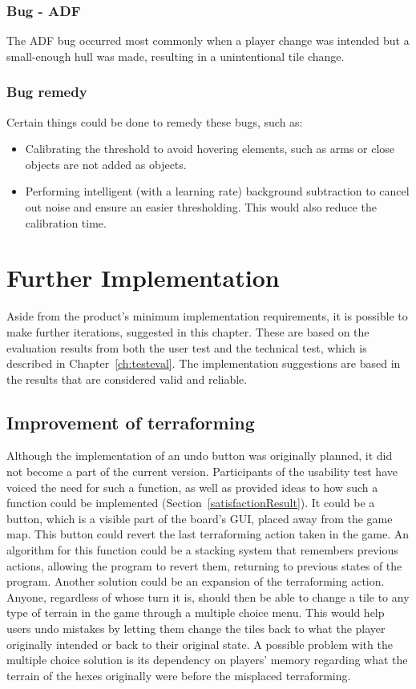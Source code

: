 \subsubsection*{Bug - ADF} 
The ADF bug occurred most commonly when a player change was intended but a small-enough hull was made, resulting in a unintentional tile change.
\subsubsection*{Bug remedy}
Certain things could be done to remedy these bugs, such as:
\begin{itemize}
	\item Calibrating the threshold to avoid hovering elements, such as arms or close objects are not added as objects.
	\item Performing intelligent (with a learning rate) background subtraction to cancel out noise and ensure an easier thresholding. This would also reduce the calibration time.
\end{itemize}

\section{Further Implementation}
Aside from the product's minimum implementation requirements, it is possible to make further iterations, suggested in this chapter. These are based on the evaluation results from both the user test and the technical test, which is described in Chapter~\ref{ch:testeval}. The implementation suggestions are based in the results that are considered valid and reliable.

\subsection{Improvement of terraforming}
Although the implementation of an undo button was originally planned, it did not become a part of the current version. Participants of the usability test have voiced the need for such a function, as well as provided ideas to how such a function could be implemented (Section~\ref{satisfactionResult}). It could be a button, which is a visible part of the board's GUI, placed away from the game map. This button could revert the last terraforming action taken in the game. An algorithm for this function could be a stacking system that remembers previous actions, allowing the program to revert them, returning to previous states of the program. Another solution could be an expansion of the terraforming action. Anyone, regardless of whose turn it is, should then be able to change a tile to any type of terrain in the game through a multiple choice menu. This would help users undo mistakes by letting them change the tiles back to what the player originally intended or back to their original state. A possible problem with the multiple choice solution is its dependency on players' memory regarding what the terrain of the hexes originally were before the misplaced terraforming. 

